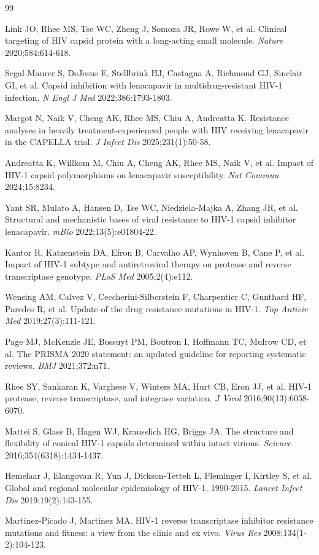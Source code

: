 \documentclass[preprint]{elsarticle}
\begin{document}
\begin{thebibliography}{99}

 Link JO, Rhee MS, Tse WC, Zheng J, Somoza JR, Rowe W, et al. Clinical targeting of HIV capsid protein with a long-acting small molecule. \textit{Nature} 2020;584:614-618.

 Segal-Maurer S, DeJesus E, Stellbrink HJ, Castagna A, Richmond GJ, Sinclair GI, et al. Capsid inhibition with lenacapavir in multidrug-resistant HIV-1 infection. \textit{N Engl J Med} 2022;386:1793-1803.

 Margot N, Naik V, Cheng AK, Rhee MS, Chiu A, Andreatta K. Resistance analyses in heavily treatment-experienced people with HIV receiving lenacapavir in the CAPELLA trial. \textit{J Infect Dis} 2025;231(1):50-58.

 Andreatta K, Willkom M, Chiu A, Cheng AK, Rhee MS, Naik V, et al. Impact of HIV-1 capsid polymorphisms on lenacapavir susceptibility. \textit{Nat Commun} 2024;15:8234.

 Yant SR, Mulato A, Hansen D, Tse WC, Niedziela-Majka A, Zhang JR, et al. Structural and mechanistic bases of viral resistance to HIV-1 capsid inhibitor lenacapavir. \textit{mBio} 2022;13(5):e01804-22.

 Kantor R, Katzenstein DA, Efron B, Carvalho AP, Wynhoven B, Cane P, et al. Impact of HIV-1 subtype and antiretroviral therapy on protease and reverse transcriptase genotype. \textit{PLoS Med} 2005;2(4):e112.

 Wensing AM, Calvez V, Ceccherini-Silberstein F, Charpentier C, Gunthard HF, Paredes R, et al. Update of the drug resistance mutations in HIV-1. \textit{Top Antivir Med} 2019;27(3):111-121.

 Page MJ, McKenzie JE, Bossuyt PM, Boutron I, Hoffmann TC, Mulrow CD, et al. The PRISMA 2020 statement: an updated guideline for reporting systematic reviews. \textit{BMJ} 2021;372:n71.

 Rhee SY, Sankaran K, Varghese V, Winters MA, Hurt CB, Eron JJ, et al. HIV-1 protease, reverse transcriptase, and integrase variation. \textit{J Virol} 2016;90(13):6058-6070.

 Mattei S, Glass B, Hagen WJ, Krausslich HG, Briggs JA. The structure and flexibility of conical HIV-1 capsids determined within intact virions. \textit{Science} 2016;354(6318):1434-1437.

 Hemelaar J, Elangovan R, Yun J, Dickson-Tetteh L, Fleminger I, Kirtley S, et al. Global and regional molecular epidemiology of HIV-1, 1990-2015. \textit{Lancet Infect Dis} 2019;19(2):143-155.

 Martinez-Picado J, Martinez MA. HIV-1 reverse transcriptase inhibitor resistance mutations and fitness: a view from the clinic and ex vivo. \textit{Virus Res} 2008;134(1-2):104-123.

\end{thebibliography}
\end{document}

